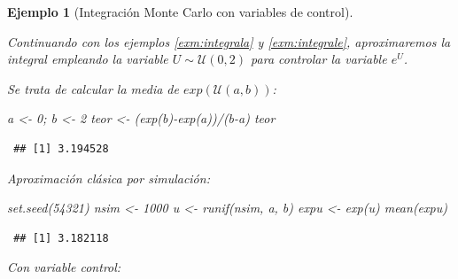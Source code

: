 \documentclass[
]{book}
\newenvironment{Shaded}{\begin{snugshade}}{\end{snugshade}}
\newcommand{\AttributeTok}[1]{\textcolor[rgb]{0.77,0.63,0.00}{#1}}
\newcommand{\CommentTok}[1]{\textcolor[rgb]{0.56,0.35,0.01}{\textit{#1}}}
\newcommand{\DecValTok}[1]{\textcolor[rgb]{0.00,0.00,0.81}{#1}}
\newcommand{\FunctionTok}[1]{\textcolor[rgb]{0.00,0.00,0.00}{#1}}
\newcommand{\NormalTok}[1]{#1}
\newcommand{\OtherTok}[1]{\textcolor[rgb]{0.56,0.35,0.01}{#1}}
\newcommand{\SpecialCharTok}[1]{\textcolor[rgb]{0.00,0.00,0.00}{#1}}
\newcommand{\StringTok}[1]{\textcolor[rgb]{0.31,0.60,0.02}{#1}}
\theoremstyle{break}
\newtheorem{example}{Ejemplo}[chapter]
\theoremstyle{nonumberplain}
\renewcommand{\CommentTok}[1]{\textcolor[rgb]{0.41,0.41,0.41}{\texttt{#1}}}
\begin{document}
\begin{example}[Integración Monte Carlo con variables de control]
\protect\hypertarget{exm:integral-contr}{}\label{exm:integral-contr}

Continuando con los ejemplos \ref{exm:integrala} y \ref{exm:integrale}, aproximaremos la integral empleando la variable \(U\sim\mathcal{U}(0,2)\) para controlar la variable \(e^{U}\).

Se trata de calcular la media de \(exp(\mathcal{U}(a,b))\):

\begin{Shaded}
\begin{Highlighting}[]
\NormalTok{a }\OtherTok{\textless{}{-}} \DecValTok{0}\NormalTok{; b }\OtherTok{\textless{}{-}} \DecValTok{2}
\NormalTok{teor }\OtherTok{\textless{}{-}}\NormalTok{ (}\FunctionTok{exp}\NormalTok{(b)}\SpecialCharTok{{-}}\FunctionTok{exp}\NormalTok{(a))}\SpecialCharTok{/}\NormalTok{(b}\SpecialCharTok{{-}}\NormalTok{a)}
\NormalTok{teor}
\end{Highlighting}
\end{Shaded}

\begin{verbatim}
 ## [1] 3.194528
\end{verbatim}

Aproximación clásica por simulación:

\begin{Shaded}
\begin{Highlighting}[]
\FunctionTok{set.seed}\NormalTok{(}\DecValTok{54321}\NormalTok{)}
\NormalTok{nsim }\OtherTok{\textless{}{-}} \DecValTok{1000}
\NormalTok{u }\OtherTok{\textless{}{-}} \FunctionTok{runif}\NormalTok{(nsim, a, b)}
\NormalTok{expu }\OtherTok{\textless{}{-}} \FunctionTok{exp}\NormalTok{(u)}
\FunctionTok{mean}\NormalTok{(expu) }
\end{Highlighting}
\end{Shaded}

\begin{verbatim}
 ## [1] 3.182118
\end{verbatim}

Con variable control:

\begin{Shaded}
\end{Shaded}


\end{example}
\end{document}
